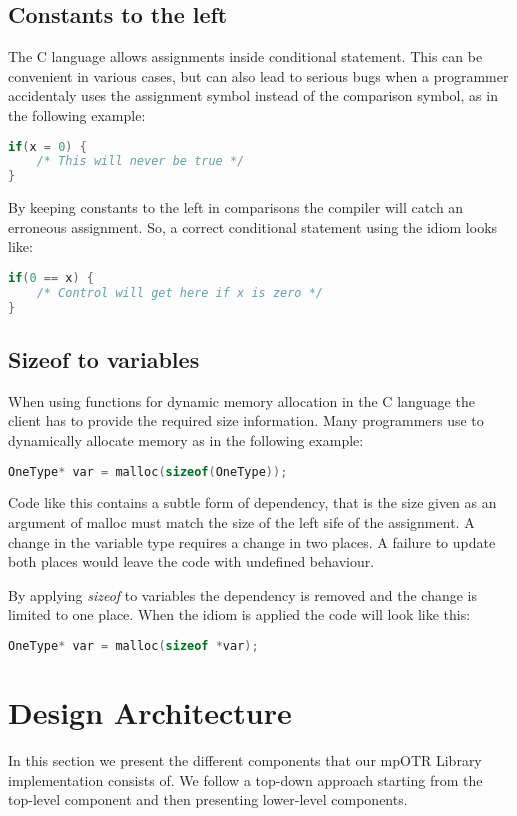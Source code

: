 \subsection{Constants to the left}
The C language allows assignments inside conditional statement. This can be convenient in various cases, but can also lead to serious bugs when a programmer accidentaly uses the assignment symbol instead of the comparison symbol, as in the following example:
\begin{lstlisting}[language=C]
if(x = 0) {
    /* This will never be true */
}
\end{lstlisting}

By keeping constants to the left in comparisons the compiler will catch an erroneous assignment. So, a correct conditional statement using the idiom looks like:
\begin{lstlisting}[language=C]
if(0 == x) {
    /* Control will get here if x is zero */
}
\end{lstlisting}


\subsection{Sizeof to variables}
When using functions for dynamic memory allocation in the C language the client has to provide the required size information. Many programmers use to dynamically allocate memory as in the following example:
\begin{lstlisting}[language=C]
OneType* var = malloc(sizeof(OneType));
\end{lstlisting}

Code like this contains a subtle form of dependency, that is the size given as an argument of malloc must match the size of the left sife of the assignment. A change in the variable type requires a change in two places. A failure to update both places would leave the code with undefined behaviour.

By applying \textit{sizeof} to variables the dependency is removed and the change is limited to one place. When the idiom is applied the code will look like this:
\begin{lstlisting}[language=C]
OneType* var = malloc(sizeof *var);
\end{lstlisting}

\section{Design Architecture}
In this section we present the different components that our mpOTR Library implementation consists of. We follow a top-down approach starting from the top-level component and then presenting lower-level components.

